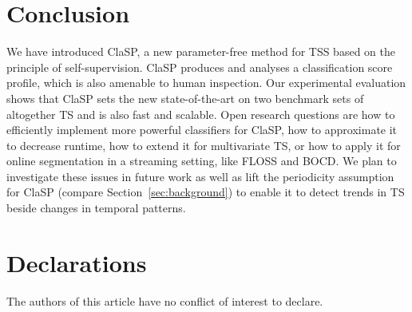 \documentclass[pdflatex,sn-basic]{sn-jnl}
\begin{document}
\section{Conclusion}\label{sec:conclusion}

We have introduced ClaSP, a new parameter-free method for TSS based on the principle of self-supervision. ClaSP produces and analyses a classification score profile, which is also amenable to human inspection. Our experimental evaluation shows that ClaSP sets the new state-of-the-art on two benchmark sets of altogether  TS and is also fast and scalable. Open research questions are how to efficiently implement more powerful classifiers for ClaSP, how to approximate it to decrease runtime, how to extend it for multivariate TS, or how to apply it for online segmentation in a streaming setting, like FLOSS and BOCD. We plan to investigate these issues in future work as well as lift the periodicity assumption for ClaSP (compare Section~\ref{sec:background}) to enable it to detect trends in TS beside changes in temporal patterns.

\section{Declarations}\label{sec:conclusion}

The authors of this article have no conflict of interest to declare. 


\end{document}

